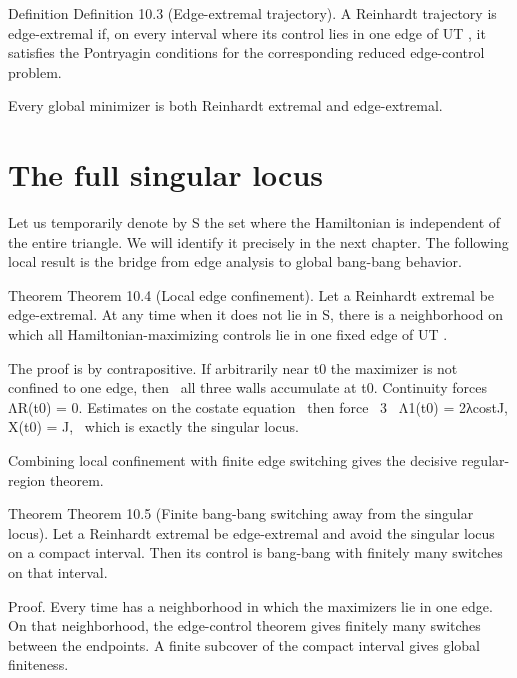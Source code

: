 \begin{statementbox}{Definition}
Definition 10.3 (Edge-extremal trajectory). A Reinhardt trajectory is edge-extremal if, on every interval where its control lies in one edge of UT , it satisfies the Pontryagin conditions for the corresponding reduced edge-control problem.
\end{statementbox}

Every global minimizer is both Reinhardt extremal and edge-extremal.


\section{The full singular locus}

Let us temporarily denote by S the set where the Hamiltonian is independent of the entire triangle. We will identify it precisely in the next chapter. The following local result is the bridge from edge analysis to global bang-bang behavior.


\begin{statementbox}{Theorem}
Theorem 10.4 (Local edge confinement). Let a Reinhardt extremal be edge-extremal. At any time when it does not lie in S, there is a neighborhood on which all Hamiltonian-maximizing controls lie in one fixed edge of UT .
\end{statementbox}

\begin{displaytext}
The proof is by contrapositive. If arbitrarily near t0 the maximizer is not confined to one edge, then \
all three walls accumulate at t0. Continuity forces ΛR(t0) = 0. Estimates on the costate equation \
then force \
3 \
Λ1(t0) = 2λcostJ, X(t0) = J, \
which is exactly the singular locus.
\end{displaytext}

Combining local confinement with finite edge switching gives the decisive regular-region theorem.


\begin{statementbox}{Theorem}
Theorem 10.5 (Finite bang-bang switching away from the singular locus). Let a Reinhardt extremal be edge-extremal and avoid the singular locus on a compact interval. Then its control is bang-bang with finitely many switches on that interval.
\end{statementbox}

\begin{prooftext}
Proof. Every time has a neighborhood in which the maximizers lie in one edge. On that neighborhood, the edge-control theorem gives finitely many switches between the endpoints. A finite subcover of the compact interval gives global finiteness.
\end{prooftext}

